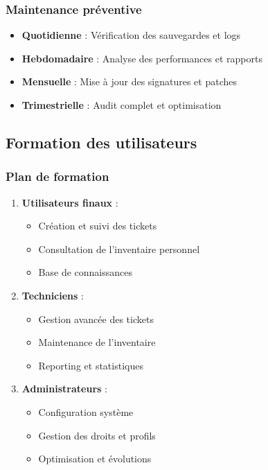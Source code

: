 \documentclass[12pt,a4paper]{article}
\begin{document}
\subsubsection{Maintenance préventive}
\begin{itemize}
    \item \textbf{Quotidienne} : Vérification des sauvegardes et logs
    \item \textbf{Hebdomadaire} : Analyse des performances et rapports
    \item \textbf{Mensuelle} : Mise à jour des signatures et patches
    \item \textbf{Trimestrielle} : Audit complet et optimisation
\end{itemize}

\subsection{Formation des utilisateurs}

\subsubsection{Plan de formation}
\begin{enumerate}
    \item \textbf{Utilisateurs finaux} :
    \begin{itemize}
        \item Création et suivi des tickets
        \item Consultation de l'inventaire personnel
        \item Base de connaissances
    \end{itemize}
    
    \item \textbf{Techniciens} :
    \begin{itemize}
        \item Gestion avancée des tickets
        \item Maintenance de l'inventaire
        \item Reporting et statistiques
    \end{itemize}
    
    \item \textbf{Administrateurs} :
    \begin{itemize}
        \item Configuration système
        \item Gestion des droits et profils
        \item Optimisation et évolutions
    \end{itemize}
\end{enumerate}
\end{document}
